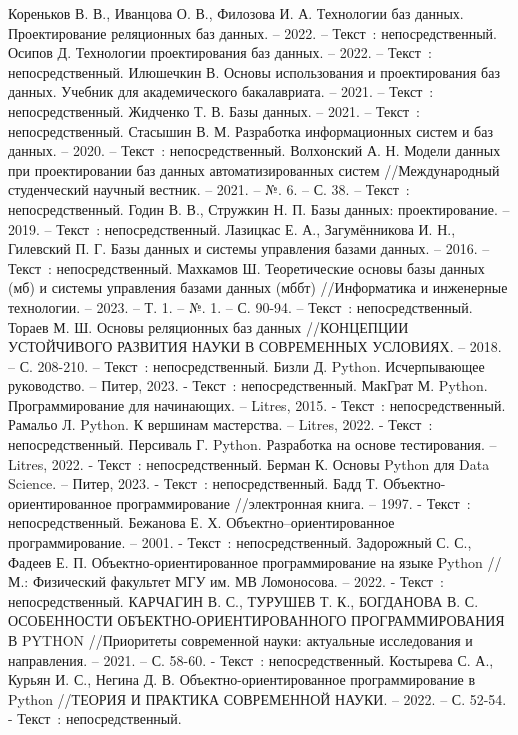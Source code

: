 
\begin{thebibliography}{9}

    \bibitem{} Кореньков В. В., Иванцова О. В., Филозова И. А. Технологии баз данных. Проектирование реляционных баз данных. – 2022. – Текст~: непосредственный.
    \bibitem{} Осипов Д. Технологии проектирования баз данных. – 2022. – Текст~: непосредственный.
    \bibitem{} Илюшечкин В. Основы использования и проектирования баз данных. Учебник для академического бакалавриата. – 2021. – Текст~: непосредственный.
    \bibitem{} Жидченко Т. В. Базы данных. – 2021. – Текст~: непосредственный.
	\bibitem{} Стасышин В. М. Разработка информационных систем и баз данных. – 2020. – Текст~: непосредственный.
	\bibitem{} Волхонский А. Н. Модели данных при проектировании баз данных автоматизированных систем //Международный студенческий научный вестник. – 2021. – №. 6. – С. 38. – Текст~: непосредственный.
	\bibitem{} Годин В. В., Стружкин Н. П. Базы данных: проектирование. – 2019. – Текст~: непосредственный.
	\bibitem{} Лазицкас Е. А., Загумённикова И. Н., Гилевский П. Г. Базы данных и системы управления базами данных. – 2016. – Текст~: непосредственный.
	\bibitem{} Махкамов Ш. Теоретические основы базы данных (мб) и системы управления базами данных (мббт) //Информатика и инженерные технологии. – 2023. – Т. 1. – №. 1. – С. 90-94. – Текст~: непосредственный.    
	\bibitem{} Тораев М. Ш. Основы реляционных баз данных //КОНЦЕПЦИИ УСТОЙЧИВОГО РАЗВИТИЯ НАУКИ В СОВРЕМЕННЫХ УСЛОВИЯХ. – 2018. – С. 208-210. – Текст~: непосредственный.    
	\bibitem{} Бизли Д. Python. Исчерпывающее руководство. – Питер, 2023. - Текст~: непосредственный.
	\bibitem{} МакГрат М. Python. Программирование для начинающих. – Litres, 2015. - Текст~: непосредственный.
	\bibitem{} Рамальо Л. Python. К вершинам мастерства. – Litres, 2022. - Текст~: непосредственный.
	\bibitem{} Персиваль Г. Python. Разработка на основе тестирования. – Litres, 2022. - Текст~: непосредственный.
	\bibitem{} Берман К. Основы Python для Data Science. – Питер, 2023. - Текст~: непосредственный.
	\bibitem{} Бадд Т. Объектно-ориентированное программирование //электронная книга. – 1997. - Текст~: непосредственный.
	\bibitem{} Бежанова Е. Х. Объектно–ориентированное программирование. – 2001. - Текст~: непосредственный.
	\bibitem{} Задорожный С. С., Фадеев Е. П. Объектно-ориентированное программирование на языке Python //М.: Физический факультет МГУ им. МВ Ломоносова. – 2022. - Текст~: непосредственный.
	\bibitem{} КАРЧАГИН В. С., ТУРУШЕВ Т. К., БОГДАНОВА В. С. ОСОБЕННОСТИ ОБЪЕКТНО-ОРИЕНТИРОВАННОГО ПРОГРАММИРОВАНИЯ В PYTHON //Приоритеты современной науки: актуальные исследования и направления. – 2021. – С. 58-60. - Текст~: непосредственный.
	\bibitem{} Костырева С. А., Курьян И. С., Негина Д. В. Объектно-ориентированное программирование в Python //ТЕОРИЯ И ПРАКТИКА СОВРЕМЕННОЙ НАУКИ. – 2022. – С. 52-54. - Текст~: непосредственный.
	
\end{thebibliography}
